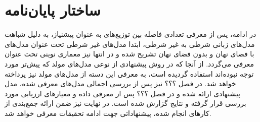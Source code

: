 \section{ساختار پایان‌نامه}
در ادامه، پس از معرفی تعدادی فاصله بین توزیع‌های به عنوان پیشنیاز، به دلیل شباهت مدل‌های زبانی شرطی به غیر شرطی، ابتدا مدل‌های غیر شرطی تحت عنوان مدل‌های با فضای نهان و بدون فضای نهان تشریح شده و در انتها نیز معماری نوینی تحت عنوان \transformer{} معرفی می‌گردد. از آنجا که در روش پیشنهادی از نوعی مدل‌های مولد که پیش‌تر مورد توجه نبوده‌اند استفاده گردیده است، به معرفی این دسته از مدل‌های مولد نیز پرداخته خواهد شد. در فصل ؟؟؟ نیز پس از بررسی اجمالی مدل‌های معرفی شده، مدل پیشنهادی ارائه شده و در فصل ؟؟؟ پس از معرفی داده و معیارهای ارزیابی مورد بررسی قرار گرفته و نتایج گزارش شده است. در نهایت نیز ضمن ارائه جمع‌بندی از کارهای انجام شده، پیشنهاداتی جهت ادامه تحقیقات معرفی خواهد شد.




